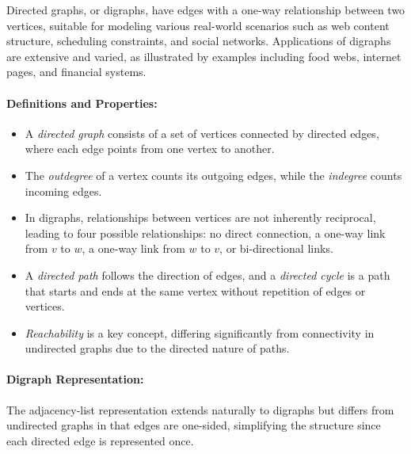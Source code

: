 \documentclass{article}
\begin{document}
Directed graphs, or digraphs, have edges with a one-way relationship between two vertices, suitable for modeling various real-world scenarios such as web content structure, scheduling constraints, and social networks. Applications of digraphs are extensive and varied, as illustrated by examples including food webs, internet pages, and financial systems.

\paragraph{Definitions and Properties:}
\begin{itemize}
    \item A \textit{directed graph} consists of a set of vertices connected by directed edges, where each edge points from one vertex to another.
    \item The \textit{outdegree} of a vertex counts its outgoing edges, while the \textit{indegree} counts incoming edges.
    \item In digraphs, relationships between vertices are not inherently reciprocal, leading to four possible relationships: no direct connection, a one-way link from $v$ to $w$, a one-way link from $w$ to $v$, or bi-directional links.
    \item A \textit{directed path} follows the direction of edges, and a \textit{directed cycle} is a path that starts and ends at the same vertex without repetition of edges or vertices.
    \item \textit{Reachability} is a key concept, differing significantly from connectivity in undirected graphs due to the directed nature of paths.
\end{itemize}

\paragraph{Digraph Representation:}
The adjacency-list representation extends naturally to digraphs but differs from undirected graphs in that edges are one-sided, simplifying the structure since each directed edge is represented once.
\end{document}
